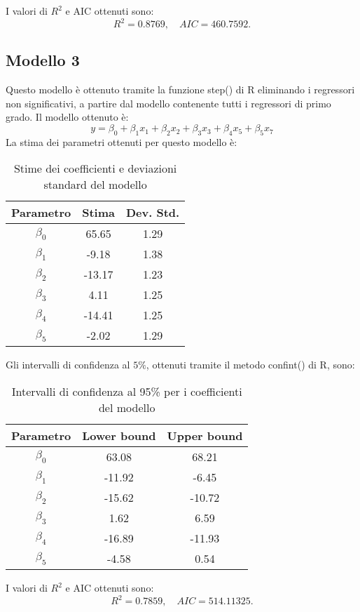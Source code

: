 I valori di $R^2$ e AIC ottenuti sono:
\begin{equation*}
	R^2 =   0.8769, \quad AIC = 460.7592.
\end{equation*}
\subsection{Modello 3}
Questo modello è ottenuto tramite la funzione step() di R eliminando i regressori non significativi, a partire dal modello contenente tutti i regressori di primo grado. Il modello ottenuto è:
\begin{equation*}
	y=\beta_0+\beta_1x_1+\beta_2x_2+\beta_3x_3+\beta_4x_5+\beta_5x_7
\end{equation*}
La stima dei parametri ottenuti per questo modello è:
\begin{table}[H]
	\centering
	\begin{tabular}{|c|c|c|}
		\hline
		\textbf{Parametro} & \textbf{Stima} & \textbf{Dev. Std.} \\
		\hline
		$\beta_0$ & 65.65  & 1.29 \\
		$\beta_1$ & -9.18  & 1.38 \\
		$\beta_2$ & -13.17 & 1.23 \\
		$\beta_3$ & 4.11   & 1.25 \\
		$\beta_4$ & -14.41 & 1.25 \\
		$\beta_5$ & -2.02  & 1.29 \\
		\hline
	\end{tabular}
	\caption{Stime dei coefficienti e deviazioni standard del modello}
	\label{tab:coef_estimates_poly}
\end{table}
Gli intervalli di confidenza al $5\%$, ottenuti tramite il metodo confint() di R, sono:
\begin{table}[H]
	\centering
	\begin{tabular}{|c|c|c|}
		\hline
		\textbf{Parametro} & \textbf{Lower bound} & \textbf{Upper bound} \\
		\hline
		$\beta_0$ & 63.08 & 68.21 \\
		$\beta_1$ & -11.92 & -6.45 \\
		$\beta_2$ & -15.62 & -10.72 \\
		$\beta_3$ & 1.62 & 6.59 \\
		$\beta_4$ & -16.89 & -11.93 \\
		$\beta_5$ & -4.58 & 0.54 \\
		\hline
	\end{tabular}
	\caption{Intervalli di confidenza al 95\% per i coefficienti del modello}
	\label{tab:ci_coefficienti}
\end{table}
I valori di $R^2$ e AIC ottenuti sono:
\begin{equation*}
	R^2 =    0.7859, \quad AIC =  514.11325.
\end{equation*}
